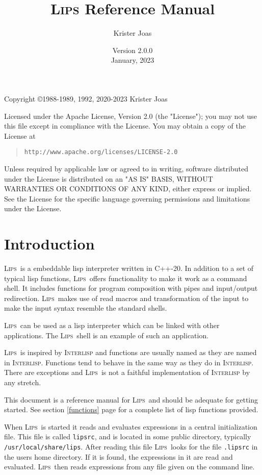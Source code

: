 \documentclass[a4paper]{article}
\title{\textsc{Lips} Reference Manual}
\author{Krister Joas}
\date{Version 2.0.0\\January, 2023}
\newcommand{\lips}{\textsc{Lips}}
\begin{document}
\maketitle
Copyright \copyright 1988-1989, 1992, 2020-2023 Krister Joas

Licensed under the Apache License, Version 2.0 (the "License"); you
may not use this file except in compliance with the License.  You may
obtain a copy of the License at

\begin{quotation}
\texttt{http://www.apache.org/licenses/LICENSE-2.0}
\end{quotation}

Unless required by applicable law or agreed to in writing, software
distributed under the License is distributed on an "AS IS" BASIS,
WITHOUT WARRANTIES OR CONDITIONS OF ANY KIND, either express or
implied.  See the License for the specific language governing
permissions and limitations under the License.

\section{Introduction}
\lips\ is a embeddable lisp interpreter written in \textsf{C++-20}.
In addition to a set of typical lisp functions, \lips\ offers
functionality to make it work as a command shell.  It includes
functions for program composition with pipes and input/output
redirection.  \lips\ makes use of read macros and transformation of
the input to make the input syntax resemble the standard shells.

\lips\ can be used as a lisp interpreter which can be linked with
other applications.  The \lips\ shell is an example of such an
application.

\lips\ is inspired by \textsc{Interlisp} and functions are usually
named as they are named in \textsc{Interlisp}.  Functions tend to
behave in the same way as they do in \textsc{Interlisp}.  There are
exceptions and \lips\ is not a faithful implementation of
\textsc{Interlisp} by any stretch.

This document is a reference manual for \lips\ and should be adequate
for getting started.  See section \ref{functions} page
\pageref{functions} for a complete list of lisp functions provided.

When \lips\ is started it reads and evaluates expressions in a central
initialization file.  This file is called \texttt{lipsrc}, and is
located in some public directory, typically
\texttt{/usr/local/share/lips}.  After reading this file \lips\ looks
for the file \texttt{.lipsrc} in the users home directory.  If it is
found, the expressions in it are read and evaluated. \lips\ then reads
expressions from any file given on the command line.
\end{document}
